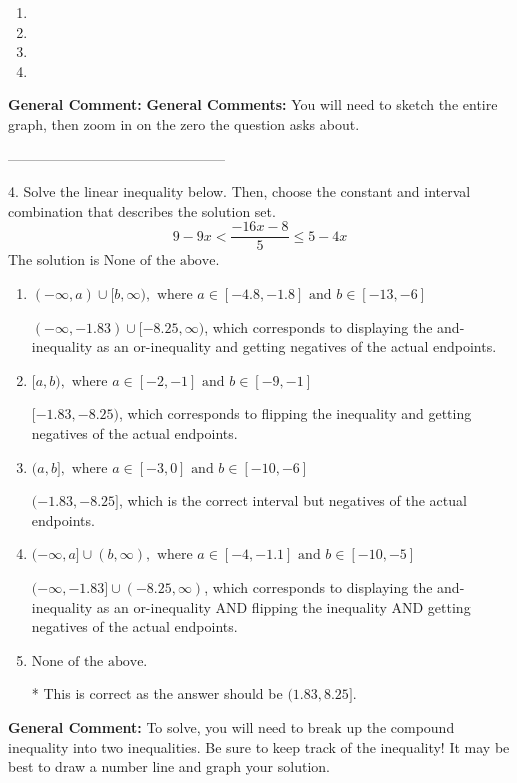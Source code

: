 \documentclass{extbook}[14pt]
\begin{document}
\begin{enumerate}[label=\Alph*.] 
\item   
\item   
\item   
\item   
\end{enumerate} 
 
\textbf{General Comment:} \textbf{General Comments:} You will need to sketch the entire graph, then zoom in on the zero the question asks about. 

-----------------------------------------------

4. Solve the linear inequality below. Then, choose the constant and interval combination that describes the solution set.
\[ 9 - 9 x < \frac{-16 x - 8}{5} \leq 5 - 4 x \] 
The solution is $ \text{None of the above.} $ 

\begin{enumerate}[label=\Alph*.] 
\item $ (-\infty, a) \cup [b, \infty), \text{ where } a \in [-4.8, -1.8] \text{ and } b \in [-13, -6] $ 

 $(-\infty, -1.83) \cup [-8.25, \infty)$, which corresponds to displaying the and-inequality as an or-inequality and getting negatives of the actual endpoints. 
\item $ [a, b), \text{ where } a \in [-2, -1] \text{ and } b \in [-9, -1] $ 

 $[-1.83, -8.25)$, which corresponds to flipping the inequality and getting negatives of the actual endpoints. 
\item $ (a, b], \text{ where } a \in [-3, 0] \text{ and } b \in [-10, -6] $ 

 $(-1.83, -8.25]$, which is the correct interval but negatives of the actual endpoints. 
\item $ (-\infty, a] \cup (b, \infty), \text{ where } a \in [-4, -1.1] \text{ and } b \in [-10, -5] $ 

 $(-\infty, -1.83] \cup (-8.25, \infty)$, which corresponds to displaying the and-inequality as an or-inequality AND flipping the inequality AND getting negatives of the actual endpoints. 
\item $ \text{None of the above.} $ 

 * This is correct as the answer should be $(1.83, 8.25]$. 
\end{enumerate} 
 
\textbf{General Comment:} To solve, you will need to break up the compound inequality into two inequalities. Be sure to keep track of the inequality! It may be best to draw a number line and graph your solution. 
\end{document}
